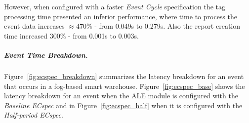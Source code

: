     

    However, when configured with a faster \textit{Event Cycle} specification the tag processing time
    presented an inferior performance, where time to process the event data increases $\approx470\%$
    - from 0.049s to 0.279s. Also the report creation time increased $300\%$ - from 0.001s to 0.003s.

    \subparagraph{Event Time Breakdown.}
    \label{subp:fog_event_breakdown}
    Figure~\ref{fig:ecspec_breakdown} summarizes the latency breakdown for an event that occurs in a fog-based
    smart warehouse. Figure~\ref{fig:ecspec_base} shows the latency breakdown for an event when the
    \gls{ALE} module is configured with the \textit{Baseline ECspec} and in Figure~\ref{fig:ecspec_half}
    when it is configured with the \textit{Half-period ECspec}.\\

